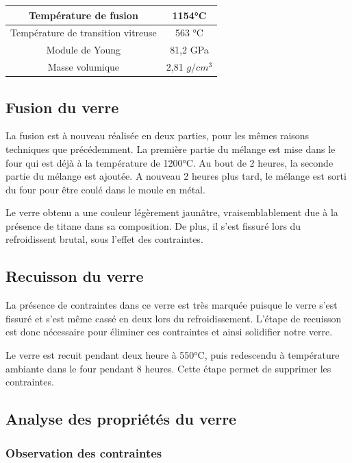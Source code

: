 \documentclass{article}
\begin{document}
\begin{table}[ht]
    \centering
\begin{tabular}{|c|c|}
    \hline
    Température de fusion & 1154°C \\
    \hline
    Température de transition vitreuse & 563 °C \\
    \hline
    Module de Young & 81,2 GPa \\
    \hline
    Masse volumique & 2,81 $g/cm^{3}$ \\
    \hline
    \end{tabular} 
\end{table}

\subsection{Fusion du verre}

La fusion est à nouveau réalisée en deux parties, pour les mêmes raisons techniques que précédemment. La première partie du mélange est mise dans le four qui est déjà à la température de 1200°C. Au bout de 2 heures, la seconde partie du mélange est ajoutée. A nouveau 2 heures plus tard, le mélange est sorti du four pour être coulé dans le moule en métal.

Le verre obtenu a une couleur légèrement jaunâtre, vraisemblablement due à la présence de titane dans sa composition. De plus, il s'est fissuré lors du refroidissent brutal, sous l'effet des contraintes.

\subsection{Recuisson du verre }

La présence de contraintes dans ce verre est très marquée puisque le verre s'est fissuré et s'est même cassé en deux lors du refroidissement. L'étape de recuisson est donc nécessaire pour éliminer ces contraintes et ainsi solidifier notre verre.

Le verre est recuit pendant deux heure à 550°C, puis redescendu à température ambiante dans le four pendant 8 heures. Cette étape permet de supprimer les contraintes.

\subsection{Analyse des propriétés du verre}

\subsubsection{Observation des contraintes}
\end{document}
